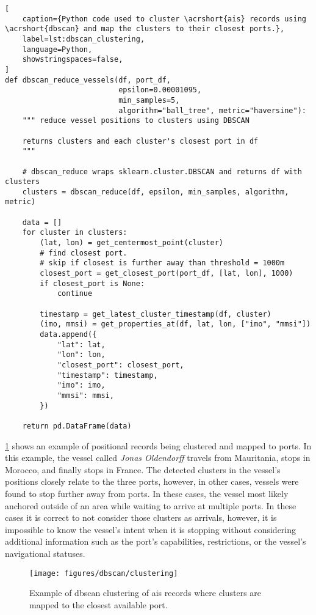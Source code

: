 \begin{lstlisting}[
    caption={Python code used to cluster \acrshort{ais} records using \acrshort{dbscan} and map the clusters to their closest ports.},
    label=lst:dbscan_clustering,
    language=Python,
    showstringspaces=false,
]
def dbscan_reduce_vessels(df, port_df,
                          epsilon=0.00001095,
                          min_samples=5,
                          algorithm="ball_tree", metric="haversine"):
    """ reduce vessel positions to clusters using DBSCAN

    returns clusters and each cluster's closest port in df
    """

    # dbscan_reduce wraps sklearn.cluster.DBSCAN and returns df with clusters
    clusters = dbscan_reduce(df, epsilon, min_samples, algorithm, metric)

    data = []
    for cluster in clusters:
        (lat, lon) = get_centermost_point(cluster)
        # find closest port.
        # skip if closest is further away than threshold = 1000m
        closest_port = get_closest_port(port_df, [lat, lon], 1000)
        if closest_port is None:
            continue

        timestamp = get_latest_cluster_timestamp(df, cluster)
        (imo, mmsi) = get_properties_at(df, lat, lon, ["imo", "mmsi"])
        data.append({
            "lat": lat,
            "lon": lon,
            "closest_port": closest_port,
            "timestamp": timestamp,
            "imo": imo,
            "mmsi": mmsi,
        })

    return pd.DataFrame(data)
\end{lstlisting}

\cref{fig:dbscan_clustering} shows an example of positional records being clustered and mapped to ports. In this example, the vessel called \textit{Jonas Oldendorff} travels from Mauritania, stops in Morocco, and finally stops in France. The detected clusters in the vessel's positions closely relate to the three ports, however, in other cases, vessels were found to stop further away from ports. In these cases, the vessel most likely anchored outside of an area while waiting to arrive at multiple ports. In these cases it is correct to not consider those clusters as arrivals, however, it is impossible to know the vessel's intent when it is stopping without considering additional information such as the port's capabilities, restrictions, or the vessel's navigational statuses.

\begin{figure}[htbp]
    \centering
    \texttt{[image: figures/dbscan/clustering]}
    \caption{Example of \acrshort{dbscan} clustering of \acrshort{ais} records where clusters are mapped to the closest available port.}
    \label{fig:dbscan_clustering}
\end{figure}

